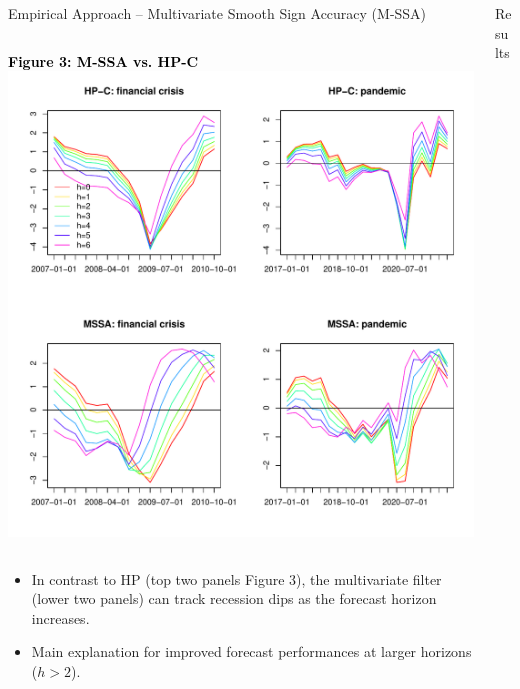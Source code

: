\documentclass[final]{beamer}
\def\autoheight{\vspace*{0pt}}%
\begin{document}
\begin{frame}
\begin{columns}[T]
\begin{column}{0.48\textwidth}
\begin{block}{\large Empirical Approach -- Multivariate Smooth Sign Accuracy (M-SSA)}
\begin{columns}[T]
				\begin{center}
				{\small{\textbf{\textcolor{black}{Figure 3: M-SSA vs. HP-C}}}}
				\includegraphics[width=1\textwidth]{./Figures/multivar_vs_univar.pdf}
				\end{center}
			
				\end{columns}	
            \begin{itemize}
				 
				\item In contrast to HP (top two panels Figure 3), the multivariate filter (lower two panels) can track recession dips as the forecast horizon increases.
                \item Main explanation for improved forecast performances at larger horizons ($h>2$).
			\end{itemize}
			\end{block}
				
			\end{column}
		\begin{column}{0.48\textwidth}
			
			\begin{block}{\large{Results}}
				

\end{block}
\end{column}
\end{columns}
\end{frame}
\end{document}
